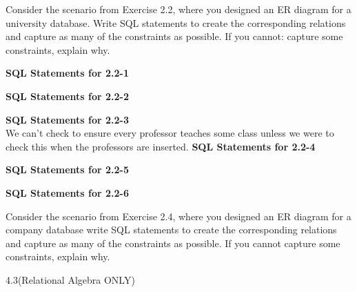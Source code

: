 




\homeworkheader{\classnameandsection}

\begin{problem}{3.12}
  Consider the scenario from Exercise 2.2, where you designed an ER diagram for a university database. Write SQL
  statements to create the corresponding relations and capture as many of the constraints as possible. If you cannot:
  capture some constraints, explain why.
  \begin{solution}
    \textbf{SQL Statements for 2.2-1}
    
    \textbf{SQL Statements for 2.2-2}
    
    \textbf{SQL Statements for 2.2-3} \\
    We can't check to ensure every professor teaches some class unless we were to check this when the professors are
    inserted.
    \br
    \textbf{SQL Statements for 2.2-4}
    
    \textbf{SQL Statements for 2.2-5}
    
    \textbf{SQL Statements for 2.2-6}
    
  \end{solution}
\end{problem}

\begin{problem}{3.14}
  Consider the scenario from Exercise 2.4, where you designed an ER diagram for a company database write SQL statements
  to create the corresponding relations and capture as many of the constraints as possible. If you cannot capture some
  constraints, explain why.
  \begin{solution}
    
  \end{solution}
\end{problem}

\begin{problem}{4.2}
\end{problem}

\begin{problem}{4.3(Relational Algebra ONLY)}
\end{problem}

\begin{problem}{4.4}
\end{problem}

\begin{problem}{5.2}
\end{problem}

\begin{problem}{5.4}
\end{problem}


